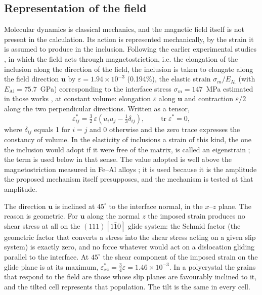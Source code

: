 \subsection{Representation of the field}
\label{sec:eigenstrain}

Molecular dynamics is classical mechanics, and the magnetic field itself is
not present in the calculation. Its action is represented mechanically, by
the strain it is assumed to produce in the inclusion. Following the earlier
experimental studies
\cite{Skvortsov2019JAP,Skvortsov2019PSS,Friha2024JMMM,Nikolaev2025SciRep},
in which the field acts through magnetostriction, i.e. the elongation of the
inclusion along the direction of the field, the inclusion is taken to
elongate along the field direction $\mathbf{u}$ by
$\varepsilon=1.94\times10^{-3}$ (0.194\%), the elastic strain
$\sigma_m/E_{\mathrm{Al}}$ (with $E_{\mathrm{Al}}=75.7$~GPa) corresponding to
the interface stress $\sigma_m=147$~MPa estimated in those works
\cite{Friha2024JMMM}, at constant volume: elongation $\varepsilon$ along $\mathbf{u}$ and contraction
$\varepsilon/2$ along the two perpendicular directions. Written as a tensor,
\begin{equation}
\varepsilon^{*}_{ij}
  =\tfrac{3}{2}\,\varepsilon\!\left(u_i u_j-\tfrac{1}{3}\delta_{ij}\right),
\qquad \operatorname{tr}\varepsilon^{*}=0,
\label{eq:eigenstrain}
\end{equation}
where $\delta_{ij}$ equals 1 for $i=j$ and 0 otherwise and the zero trace
expresses the constancy of volume. In the elasticity of inclusions a strain
of this kind, the one the inclusion would adopt if it were free of the
matrix, is called an eigenstrain \cite{Eshelby1957}; the term is used below
in that sense. The value adopted is well above the magnetostriction measured
in Fe--Al alloys \cite{Hall1959,BormioNunes2012}; it is used because it is
the amplitude the proposed mechanism itself presupposes, and the mechanism
is tested at that amplitude.

The direction $\mathbf{u}$ is inclined at $45^{\circ}$ to the interface
normal, in the $x$--$z$ plane. The reason is geometric. For $\mathbf{u}$
along the normal $z$ the imposed strain produces no shear stress at all on
the $(111)[1\bar{1}0]$ glide system: the Schmid factor (the geometric factor
that converts a stress into the shear stress acting on a given slip system)
is exactly zero, and no force whatever would act on a dislocation gliding
parallel to the interface. At $45^{\circ}$ the shear component of the
imposed strain on the glide plane is at its maximum,
$\varepsilon^{*}_{xz}=\tfrac{3}{4}\varepsilon=1.46\times10^{-3}$. In a
polycrystal the grains that respond to the field are those whose slip planes
are favourably inclined to it, and the tilted cell represents that
population. The tilt is the same in every cell.


